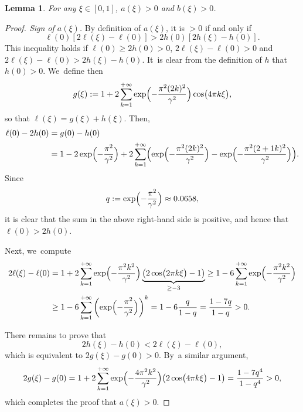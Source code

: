 \documentclass[JEP,XML,SOM,Unicode,NoFloatCountersInSection,published]{cedram}
\newtheorem{lemme}[theorem]{Lemma}
\theoremstyle{definition}
\let\EE\exp
\newcommand{\pa}[1]{\left(#1\right)}
\newcommand{\Bpa}[1]{\Bigl(#1\Bigr)}
\newcommand{\pac}[1]{\left[#1\right]}
\begin{document}
\begin{lemme} For any $\xi \in [0,1]$, $a(\xi) > 0$ and $b(\xi)>0$.
\end{lemme}

\begin{proof}[Proof. Sign of $a(\xi)$] By definition of $a(\xi)$, it is $>0$ if and only if
\[
\ell(0)\pac{2\ell(\xi)-\ell(0)} > 2h(0)\pac{2h(\xi)-h(0)}.
\]
This inequality holds if $\ell(0) \geq 2h(0) >0$, $2\ell(\xi)-\ell(0) > 0$ and $2\ell(\xi)-\ell(0) > 2h(\xi)-h(0)$. It~is clear from the definition of $h$ that $h(0) > 0$. We~define then
\[
g(\xi):= 1 + 2 \sum_{k=1}^{+\infty}\EE\Bigl({-\frac{\pi^2(2k)^2}{\gamma^2}}\Bigr) \cos\bigl({4\pi k\xi}\bigr),
\]
so that $\ell(\xi) = g(\xi) + h(\xi)$. Then,
\begin{align*}
\ell(0) - 2h(0) &= g(0) - h(0)\\
&= 1-2\EE\Bigl(-\frac{\pi^2}{\gamma^2}\Bigr) + 2\sum_{k=1}^{+\infty}\Bpa{\EE\Bigl({-\frac{\pi^2(2k)^2}{\gamma^2}}\Bigr)-\EE\Bigl({-\frac{\pi^2(2+1k)^2}{\gamma^2}}\Bigr)}.
\end{align*}
Since
\[
q:= \EE\Bigl(-\frac{\pi^2}{\gamma^2}\Bigr) \approx 0.0658,
\]
it is clear that the sum in the above right-hand side is positive, and hence that $\ell(0) > 2 h(0)$.

Next, we~compute
\begin{align*}
2\ell(\xi) - \ell(0) &= 1 + 2 \sum_{k=1}^{+\infty} \EE\Bigl({-\frac{\pi^2k^2}{\gamma^2}}\Bigr)\underbrace{\pa{2\cos\bigl({2\pi k \xi}\bigr)-1}}_{\geq -3} \geq 1 - 6\sum_{k=1}^{+\infty}\EE\Bigl({-\frac{\pi^2k^2}{\gamma^2}}\Bigr) \\
& \geq 1 - 6\sum_{k=1}^{+\infty}\pa{ \EE\Bigl(-\frac{\pi^2}{\gamma^2} \Bigr) }^k = 1 - 6\frac{q}{1-q} = \frac{1-7q}{1-q} > 0.
\end{align*}

There remains to prove that
\[
2h(\xi)-h(0) < 2\ell(\xi)-\ell(0),
\]
which is equivalent to $2g(\xi)-g(0) > 0$. By~a similar argument,
\[
2g(\xi) - g(0) = 1 + 2 \sum_{k=1}^{+\infty} \EE\Bigl(-\frac{4\pi^2k^2}{\gamma^2}\Bigr) \bigl({2\cos\bigl(4\pi k \xi \bigr)-1}\bigr) = \frac{1-7q^4}{1-q^4}> 0,
\]
which completes the proof that $a(\xi) > 0$.


\end{proof}
\end{document}
